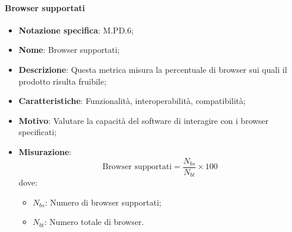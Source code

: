 \paragraph*{Browser supportati}
\begin{itemize}
    \item \textbf{Notazione specifica}: M.PD.6;
    \item \textbf{Nome}: Browser supportati;
    \item \textbf{Descrizione}: Questa metrica misura la percentuale di browser sui quali il prodotto risulta fruibile;
    \item \textbf{Caratteristiche}: Funzionalità, interoperabilità, compatibilità;
    \item \textbf{Motivo}: Valutare la capacità del software di interagire con i browser specificati;
    \item \textbf{Misurazione}:
    \[
    \text{Browser supportati} = \frac{N_{bs}}{N_{bt}} \times 100
    \]
    dove:
    \begin{itemize}
        \item $N_{bs}$: Numero di browser supportati;
        \item $N_{bt}$: Numero totale di browser.
    \end{itemize}
\end{itemize}
